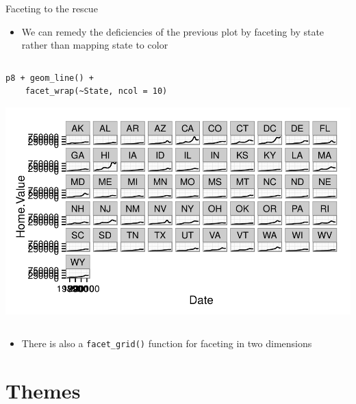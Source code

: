 \documentclass[table,smaller]{beamer}
\begin{document}
\begin{frame}[fragile,label=sec-5-4]{Faceting to the rescue}
 \begin{itemize}
\item We can remedy the deficiencies of the previous plot by faceting by state rather than mapping state to color
\end{itemize}

\begin{columns}  \begin{block}{}

\begin{verbatim}
p8 + geom_line() +
    facet_wrap(~State, ncol = 10)
\end{verbatim}

\includegraphics[width=.9\linewidth]{images/housing2.png}

\end{block} \end{columns}

\begin{itemize}
\item There is also a \verb~facet_grid()~ function for faceting in two dimensions
\end{itemize}
\end{frame}

\section{Themes}
\label{sec-6}
\end{document}
